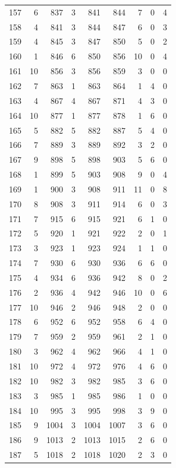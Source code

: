 \begin{longtable}{@{}rrrrrrrrr@{}}
157 & 6 & 837 & 3 & 841 & 844 & 7 & 0 & 4 \\
158 & 4 & 841 & 3 & 844 & 847 & 6 & 0 & 3 \\
159 & 4 & 845 & 3 & 847 & 850 & 5 & 0 & 2 \\
160 & 1 & 846 & 6 & 850 & 856 & 10 & 0 & 4 \\
161 & 10 & 856 & 3 & 856 & 859 & 3 & 0 & 0 \\
162 & 7 & 863 & 1 & 863 & 864 & 1 & 4 & 0 \\
163 & 4 & 867 & 4 & 867 & 871 & 4 & 3 & 0 \\
164 & 10 & 877 & 1 & 877 & 878 & 1 & 6 & 0 \\
165 & 5 & 882 & 5 & 882 & 887 & 5 & 4 & 0 \\
166 & 7 & 889 & 3 & 889 & 892 & 3 & 2 & 0 \\
167 & 9 & 898 & 5 & 898 & 903 & 5 & 6 & 0 \\
168 & 1 & 899 & 5 & 903 & 908 & 9 & 0 & 4 \\
169 & 1 & 900 & 3 & 908 & 911 & 11 & 0 & 8 \\
170 & 8 & 908 & 3 & 911 & 914 & 6 & 0 & 3 \\
171 & 7 & 915 & 6 & 915 & 921 & 6 & 1 & 0 \\
172 & 5 & 920 & 1 & 921 & 922 & 2 & 0 & 1 \\
173 & 3 & 923 & 1 & 923 & 924 & 1 & 1 & 0 \\
174 & 7 & 930 & 6 & 930 & 936 & 6 & 6 & 0 \\
175 & 4 & 934 & 6 & 936 & 942 & 8 & 0 & 2 \\
176 & 2 & 936 & 4 & 942 & 946 & 10 & 0 & 6 \\
177 & 10 & 946 & 2 & 946 & 948 & 2 & 0 & 0 \\
178 & 6 & 952 & 6 & 952 & 958 & 6 & 4 & 0 \\
179 & 7 & 959 & 2 & 959 & 961 & 2 & 1 & 0 \\
180 & 3 & 962 & 4 & 962 & 966 & 4 & 1 & 0 \\
181 & 10 & 972 & 4 & 972 & 976 & 4 & 6 & 0 \\
182 & 10 & 982 & 3 & 982 & 985 & 3 & 6 & 0 \\
183 & 3 & 985 & 1 & 985 & 986 & 1 & 0 & 0 \\
184 & 10 & 995 & 3 & 995 & 998 & 3 & 9 & 0 \\
185 & 9 & 1004 & 3 & 1004 & 1007 & 3 & 6 & 0 \\
186 & 9 & 1013 & 2 & 1013 & 1015 & 2 & 6 & 0 \\
187 & 5 & 1018 & 2 & 1018 & 1020 & 2 & 3 & 0 \\

\end{longtable}
